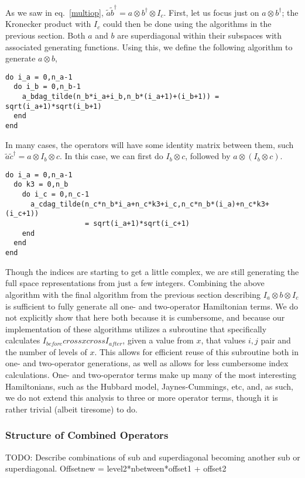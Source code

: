 \documentclass{article}
\begin{document}
As we saw in eq.~\ref{multiop}, $\tilde{a} \tilde{b}^\dagger = a \otimes b^\dagger \otimes I_c$.
First, let us focus just on $a\otimes b^\dagger$; the Kronecker product with $I_c$ could then
be done using the algorithms in the previous section. Both $a$ and $b$ are superdiagonal
within their subspaces with associated generating functions.
Using this, we define the following algorithm to generate $a \otimes b$,

\begin{verbatim}
do i_a = 0,n_a-1
  do i_b = 0,n_b-1
    a_bdag_tilde(n_b*i_a+i_b,n_b*(i_a+1)+(i_b+1)) = sqrt(i_a+1)*sqrt(i_b+1)
  end
end
\end{verbatim}

In many cases, the operators will have some identity matrix between them, such
$\tilde{a} \tilde{c}^\dagger = a \otimes I_b \otimes c$. In this case, we can
first do $I_b \otimes c$, followed by $a \otimes (I_b \otimes c)$.

\begin{verbatim}
do i_a = 0,n_a-1
  do k3 = 0,n_b
    do i_c = 0,n_c-1
      a_cdag_tilde(n_c*n_b*i_a+n_c*k3+i_c,n_c*n_b*(i_a)+n_c*k3+(i_c+1)) 
                   = sqrt(i_a+1)*sqrt(i_c+1)
    end
  end
end
\end{verbatim}

Though the indices are starting to get a little complex, we are still generating the full
space representations from just a few integers. Combining the above algorithm with the final
algorithm from the previous section describing $I_a \otimes b \otimes I_c$ is sufficient
to fully generate all one- and two-operator Hamiltonian terms. We do not explicitly
show that here both because it is cumbersome, and because our implementation of these
algorithms utilizes a subroutine that specifically calculates
$I_{before} cross x cross I_{after}$, given a value from $x$, that values $i,j$ pair
and the number of levels of $x$. This allows for efficient reuse of this subroutine
both in one- and two-operator generations, as well as allows for less cumbersome
index calculations. One- and two-operator terms make up
many of the most interesting Hamiltonians, such as the Hubbard model, Jaynes-Cummings, etc,
and, as such, we do not extend this analysis to three or more operator terms, though
it is rather trivial (albeit tiresome) to do.

\subsubsection{Structure of Combined Operators}
TODO: Describe combinations of sub and superdiagonal becoming another sub or superdiagonal.
Offsetnew = level2*nbetween*offset1 + offset2
\bigskip
\end{document}
